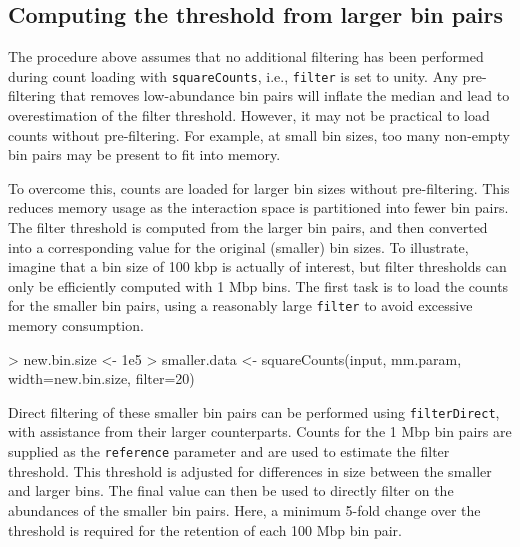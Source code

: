 \documentclass[12pt]{report}
\renewenvironment{Schunk}{\vspace{0pt}}{\vspace{0pt}}
\newcommand{\code}[1]{{\small\texttt{#1}}}
\begin{document}
\subsection{Computing the threshold from larger bin pairs}
The procedure above assumes that no additional filtering has been performed during count loading with \code{squareCounts}, i.e., \code{filter} is set to unity.
Any pre-filtering that removes low-abundance bin pairs will inflate the median and lead to overestimation of the filter threshold. 
However, it may not be practical to load counts without pre-filtering.
For example, at small bin sizes, too many non-empty bin pairs may be present to fit into memory.

To overcome this, counts are loaded for larger bin sizes without pre-filtering.
This reduces memory usage as the interaction space is partitioned into fewer bin pairs.
The filter threshold is computed from the larger bin pairs, and then converted into a corresponding value for the original (smaller) bin sizes.
To illustrate, imagine that a bin size of 100 kbp is actually of interest, but filter thresholds can only be efficiently computed with 1 Mbp bins.
The first task is to load the counts for the smaller bin pairs, using a reasonably large \code{filter} to avoid excessive memory consumption.

\begin{Schunk}
\begin{Sinput}
> new.bin.size <- 1e5
> smaller.data <- squareCounts(input, mm.param, width=new.bin.size, filter=20)
\end{Sinput}
\end{Schunk}

Direct filtering of these smaller bin pairs can be performed using \code{filterDirect}, with assistance from their larger counterparts.
Counts for the 1 Mbp bin pairs are supplied as the \code{reference} parameter and are used to estimate the filter threshold.
This threshold is adjusted for differences in size between the smaller and larger bins.
The final value can then be used to directly filter on the abundances of the smaller bin pairs.
Here, a minimum 5-fold change over the threshold is required for the retention of each 100 Mbp bin pair.

\end{document}
